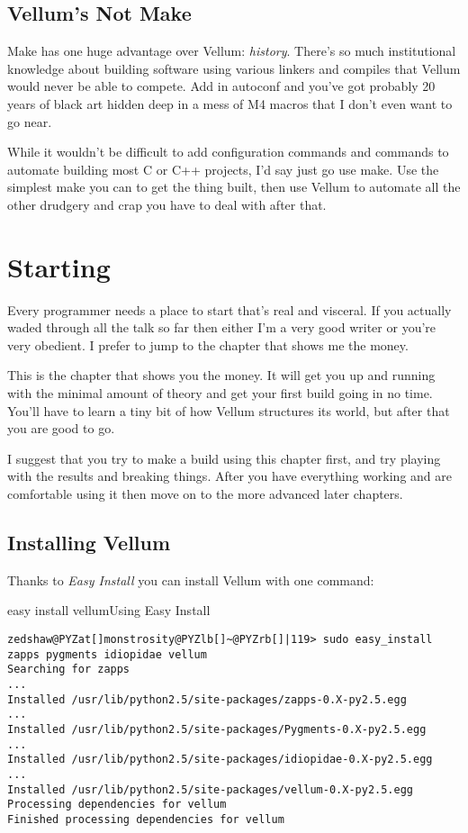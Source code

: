 \section{Vellum's Not Make}

Make has one huge advantage over Vellum:  \emph{history}.  There's so much
institutional knowledge about building software using various linkers and
compiles that Vellum would never be able to compete.  Add in autoconf and you've
got probably 20 years of black art hidden deep in a mess of M4 macros that I
don't even want to go near.

While it wouldn't be difficult to add configuration commands and commands to
automate building most C or C++ projects, I'd say just go use make.  Use the
simplest make you can to get the thing built, then use Vellum to automate all
the other drudgery and crap you have to deal with after that.



\chapter{Starting}
\label{chapter:Starting}

Every programmer needs a place to start that's real and visceral.  If you
actually waded through all the talk so far then either I'm a very good writer or
you're very obedient.  I prefer to jump to the chapter that shows me the money.

This is the chapter that shows you the money.  It will get you up and running
with the minimal amount of theory and get your first build going in no time.
You'll have to learn a tiny bit of how Vellum structures its world, but after
that you are good to go.

I suggest that you try to make a build using this chapter first, and try playing
with the results and breaking things.  After you have everything working and are
comfortable using it then move on to the more advanced later chapters.



\section{Installing Vellum}

Thanks to \emph{Easy Install} you can install Vellum with one command:

\begin{code}{easy install vellum}{Using Easy Install}
\begin{Verbatim}[commandchars=@\[\]]
zedshaw@PYZat[]monstrosity@PYZlb[]~@PYZrb[]|119> sudo easy_install zapps pygments idiopidae vellum
Searching for zapps
...
Installed /usr/lib/python2.5/site-packages/zapps-0.X-py2.5.egg
...
Installed /usr/lib/python2.5/site-packages/Pygments-0.X-py2.5.egg
...
Installed /usr/lib/python2.5/site-packages/idiopidae-0.X-py2.5.egg
...
Installed /usr/lib/python2.5/site-packages/vellum-0.X-py2.5.egg
Processing dependencies for vellum
Finished processing dependencies for vellum
\end{Verbatim}

\end{code}

